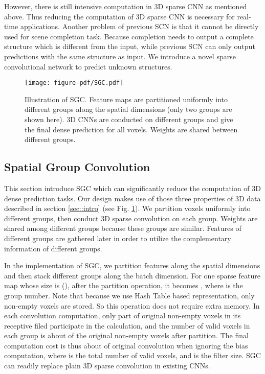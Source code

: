 \documentclass[runningheads]{llncs}
\begin{document}
However, there is still intensive computation in 3D sparse CNN as mentioned above. Thus reducing the computation of 3D sparse CNN is necessary for real-time applications. Another problem of previous SCN is that it cannot be directly used for scene completion task. Because completion needs to output a complete structure which is different from the input, while previous SCN can only output predictions with the same structure as input. We introduce a novel sparse convolutional network to predict unknown structures.
\begin{figure}[t]
\centering
\texttt{[image: figure-pdf/SGC.pdf]}
\caption{Illustration of SGC. Feature maps are partitioned uniformly into different groups along the spatial dimensions (only two groups are shown here). 3D CNNs are conducted on different groups and give the final dense prediction for all voxels. Weights are shared between different groups.}
\label{fig:spatialGroupConv}
\end{figure}

\subsection{Spatial Group Convolution}
This section introduce SGC which can significantly reduce the computation of 3D dense prediction tasks.
Our design makes use of those three properties of 3D data described in section \ref{sec::intro} (see Fig. \ref{fig:spatialGroupConv}). We partition voxels uniformly into different groups, then conduct 3D sparse convolution on each group.
Weights are shared among different groups because these groups are similar. Features of different groups are gathered later in order to utilize the complementary information of different groups.

In the implementation of SGC, we partition features along the spatial dimensions and then stack different groups along the batch dimension. For one sparse feature map whose size is  (), after the partition operation, it becomes , where  is the group number. Note that because we use Hash Table based representation, only non-empty voxels are stored. So this operation does not require extra memory. In each convolution computation, only part of original non-empty voxels in its receptive filed participate in the calculation, and the number of valid voxels in each group is about  of the original non-empty voxels after partition. The final computation cost is thus about  of original convolution when ignoring the bias computation, where  is the total number of valid voxels, and  is the filter size. SGC can readily replace plain 3D sparse convolution in existing CNNs.
\end{document}

